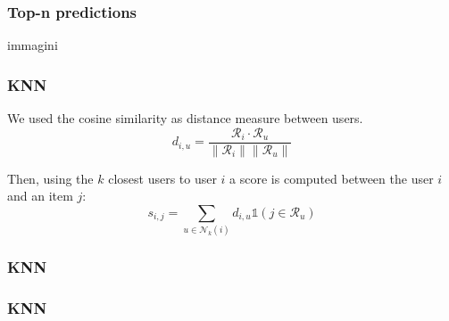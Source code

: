 \documentclass{beamer}
\begin{document}
%
%
%

\begin{frame}

\frametitle{Top-n predictions}

immagini


\end{frame}

















%
%
%

\begin{frame}

\frametitle{KNN}
We used the cosine similarity as distance measure between users.
$$
d_{i,u} = \frac{ \mathcal{R}_i \cdot \mathcal{R}_u} {\|{\mathcal{R}_i} \|        \| {\mathcal{R}_u}   \|}
$$

Then, using the $k$ closest users to user $i$ a score is computed between the user $i$ and an item $j$:\\ 
$$
s_{i,j} = \sum_{u \in \mathcal{N}_k(i)} d_{i,u} \mathds{1}( j \in \mathcal{R}_u)
$$


\end{frame}


%
%
%

\begin{frame}

\frametitle{KNN}


\end{frame}



%
%
%

\begin{frame}

\frametitle{KNN}


\end{frame}
\end{document}
